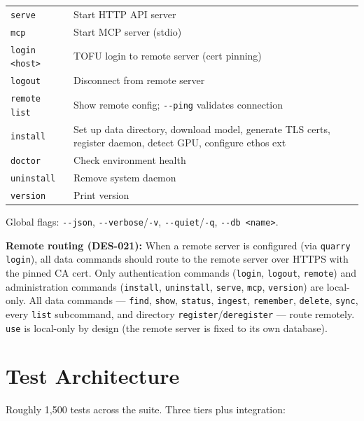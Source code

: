 \documentclass[a4paper,10pt]{article}
\begin{document}
\begin{center}
\begin{longtable}{lp{8cm}}
\texttt{serve}                & Start HTTP API server \\
\texttt{mcp}                  & Start MCP server (stdio) \\
\texttt{login <host>}         & TOFU login to remote server (cert pinning) \\
\texttt{logout}              & Disconnect from remote server \\
\texttt{remote list}         & Show remote config; \texttt{-{}-ping} validates connection \\
\texttt{install}             & Set up data directory, download model, generate TLS certs,
  register daemon, detect GPU, configure ethos ext \\
\texttt{doctor}              & Check environment health \\
\texttt{uninstall}           & Remove system daemon \\
\texttt{version}             & Print version \\
\bottomrule
\end{longtable}
\end{center}

Global flags: \texttt{-{}-json}, \texttt{-{}-verbose}/\texttt{-v},
\texttt{-{}-quiet}/\texttt{-q}, \texttt{-{}-db <name>}.

\textbf{Remote routing (DES-021):} When a remote server is configured
(via \texttt{quarry login}), all data commands should route to the
remote server over HTTPS with the pinned CA cert.  Only authentication
commands (\texttt{login}, \texttt{logout}, \texttt{remote}) and
administration commands (\texttt{install}, \texttt{uninstall},
\texttt{serve}, \texttt{mcp}, \texttt{version}) are local-only.
All data commands --- \texttt{find}, \texttt{show}, \texttt{status},
\texttt{ingest}, \texttt{remember}, \texttt{delete}, \texttt{sync},
every \texttt{list} subcommand, and directory
\texttt{register}/\texttt{deregister} --- route remotely.  \texttt{use}
is local-only by design (the remote server is fixed to its own
database).

\section{Test Architecture}

Roughly 1{,}500 tests across the suite.  Three tiers plus integration:
\end{document}
